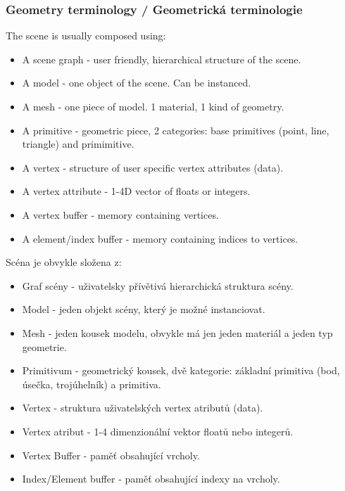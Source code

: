 \begin{frame}
\frametitle{Geometry terminology / Geometrická terminologie}
  \scriptsize
  The scene is usually composed using:
	\begin{itemize}
    \item{A scene graph - user friendly, hierarchical structure of the scene.}
    \item{A model - one object of the scene. Can be instanced.}
    \item{A mesh - one piece of model. 1 material, 1 kind of geometry.}
    \item{A primitive - geometric piece, 2 categories: base primitives (point, line, triangle) and primimitive.}
    \item{A vertex - structure of user specific vertex attributes (data).}
		\item{A vertex attribute - 1-4D vector of floats or integers.}
    \item{A vertex buffer - memory containing vertices.}
    \item{A element/index buffer - memory containing indices to vertices.}
	\end{itemize}

  Scéna je obvykle složena z:
	\begin{itemize}
    \item{Graf scény - uživatelsky přívětivá hierarchická struktura scény.}
    \item{Model - jeden objekt scény, který je možné instanciovat.}
    \item{Mesh - jeden kousek modelu, obvykle má jen jeden materiál a jeden typ geometrie.}
    \item{Primitivum - geometrický kousek, dvě kategorie: základní primitiva (bod, úsečka, trojúhelník) a primitiva.}
    \item{Vertex - struktura uživatelských vertex atributů (data).}
		\item{Vertex atribut - 1-4 dimenzionální vektor floatů nebo integerů.}
    \item{Vertex Buffer - paměť obsahující vrcholy.}
    \item{Index/Element buffer - paměť obsahující indexy na vrcholy.}
	\end{itemize}
\end{frame}


